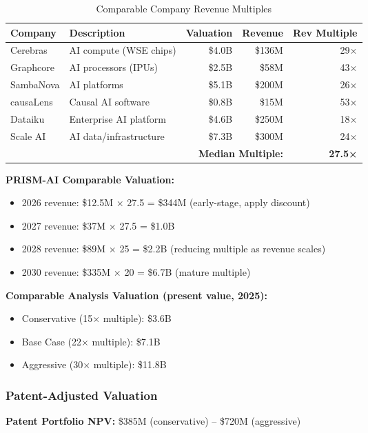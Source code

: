 \documentclass[11pt,letterpaper]{article}
\begin{document}
\begin{table}[H]
\centering
\small
\begin{tabularx}{\textwidth}{lXrrr}
\toprule
\textbf{Company} & \textbf{Description} & \textbf{Valuation} & \textbf{Revenue} & \textbf{Rev Multiple} \\
\midrule
Cerebras & AI compute (WSE chips) & \$4.0B & \$136M & 29× \\
Graphcore & AI processors (IPUs) & \$2.5B & \$58M & 43× \\
SambaNova & AI platforms & \$5.1B & \$200M & 26× \\
causaLens & Causal AI software & \$0.8B & \$15M & 53× \\
Dataiku & Enterprise AI platform & \$4.6B & \$250M & 18× \\
Scale AI & AI data/infrastructure & \$7.3B & \$300M & 24× \\
\midrule
\multicolumn{4}{r}{\textbf{Median Multiple:}} & \textbf{27.5×} \\
\bottomrule
\end{tabularx}
\caption{Comparable Company Revenue Multiples}
\end{table}

\textbf{PRISM-AI Comparable Valuation:}
\begin{itemize}
    \item 2026 revenue: \$12.5M × 27.5 = \$344M (early-stage, apply discount)
    \item 2027 revenue: \$37M × 27.5 = \$1.0B
    \item 2028 revenue: \$89M × 25 = \$2.2B (reducing multiple as revenue scales)
    \item 2030 revenue: \$335M × 20 = \$6.7B (mature multiple)
\end{itemize}

\textbf{Comparable Analysis Valuation (present value, 2025):}
\begin{itemize}
    \item Conservative (15× multiple): \$3.6B
    \item Base Case (22× multiple): \$7.1B
    \item Aggressive (30× multiple): \$11.8B
\end{itemize}

\subsubsection{Patent-Adjusted Valuation}

\textbf{Patent Portfolio NPV:} \$385M (conservative) -- \$720M (aggressive)
\end{document}
